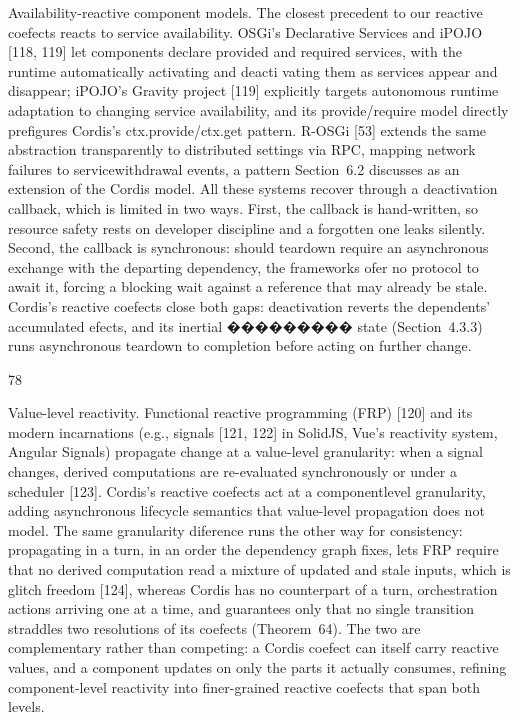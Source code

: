 \documentclass[
  10
]{article}
\begin{document}
Availability-reactive component models. The closest precedent to our
reactive coefects reacts to service availability. OSGi's Declarative
Services and iPOJO {[}118, 119{]} let components declare provided and
required services, with the runtime automatically activating and deacti
vating them as services appear and disappear; iPOJO's Gravity project
{[}119{]} explicitly targets autonomous runtime adaptation to changing
service availability, and its provide/require model directly prefigures
Cordis's ctx.provide/ctx.get pattern. R-OSGi {[}53{]} extends the same
abstraction transparently to distributed settings via RPC, mapping
network failures to servicewithdrawal events, a pattern Section~6.2
discusses as an extension of the Cordis model. All these systems recover
through a deactivation callback, which is limited in two ways. First,
the callback is hand-written, so resource safety rests on developer
discipline and a forgotten one leaks silently. Second, the callback is
synchronous: should teardown require an asynchronous exchange with the
departing dependency, the frameworks ofer no protocol to await it,
forcing a blocking wait against a reference that may already be stale.
Cordis's reactive coefects close both gaps: deactivation reverts the
dependents' accumulated efects, and its inertial ��������� state
(Section~4.3.3) runs asynchronous teardown to completion before acting
on further change.

78

Value-level reactivity. Functional reactive programming (FRP) {[}120{]}
and its modern incarnations (e.g., signals {[}121, 122{]} in SolidJS,
Vue's reactivity system, Angular Signals) propagate change at a
value-level granularity: when a signal changes, derived computations are
re-evaluated synchronously or under a scheduler {[}123{]}. Cordis's
reactive coefects act at a componentlevel granularity, adding
asynchronous lifecycle semantics that value-level propagation does not
model. The same granularity diference runs the other way for
consistency: propagating in a turn, in an order the dependency graph
fixes, lets FRP require that no derived computation read a mixture of
updated and stale inputs, which is glitch freedom {[}124{]}, whereas
Cordis has no counterpart of a turn, orchestration actions arriving one
at a time, and guarantees only that no single transition straddles two
resolutions of its coefects (Theorem~64). The two are complementary
rather than competing: a Cordis coefect can itself carry reactive
values, and a component updates on only the parts it actually consumes,
refining component-level reactivity into finer-grained reactive coefects
that span both levels.
\end{document}
